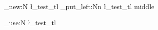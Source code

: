 \ExplSyntaxOn
\tl_new:N \l_test_tl
\tl_put_left:Nn \l_test_tl {middle}

\tl_use:N \l_test_tl
\ExplSyntaxOff
